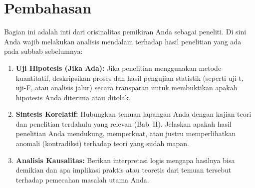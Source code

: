 \section{Pembahasan}

Bagian ini adalah inti dari orisinalitas pemikiran Anda sebagai peneliti. Di sini Anda wajib melakukan analisis mendalam terhadap hasil penelitian yang ada pada subbab sebelumnya:

\begin{enumerate}
	\item \textbf{Uji Hipotesis (Jika Ada):} Jika penelitian menggunakan metode kuantitatif, deskripsikan proses dan hasil pengujian statistik (seperti uji-t, uji-F, atau analisis jalur) secara transparan untuk membuktikan apakah hipotesis Anda diterima atau ditolak.
	\item \textbf{Sintesis Korelatif:} Hubungkan temuan lapangan Anda dengan kajian teori dan penelitian terdahulu yang relevan (Bab~II). Jelaskan apakah hasil penelitian Anda mendukung, memperkuat, atau justru memperlihatkan anomali (kontradiksi) terhadap teori yang sudah mapan.
	\item \textbf{Analisis Kausalitas:} Berikan interpretasi logis mengapa hasilnya bisa demikian dan apa implikasi praktis atau teoretis dari temuan tersebut terhadap pemecahan masalah utama Anda.
\end{enumerate}
